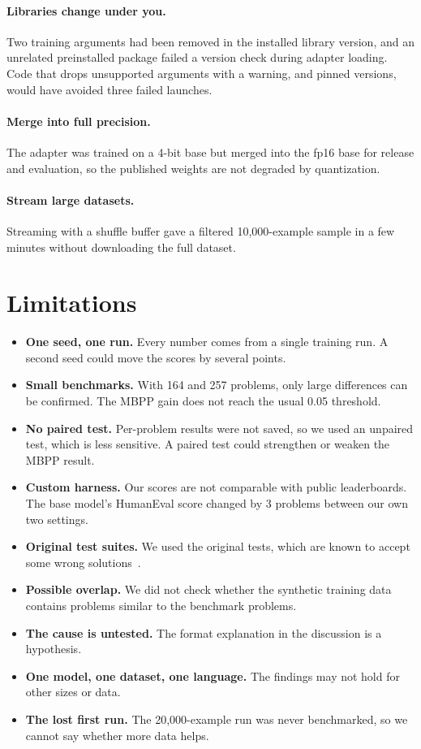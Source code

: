 \documentclass[11pt,a4paper]{article}
\begin{document}
\paragraph{Libraries change under you.} Two training arguments had been removed in the installed library version, and an unrelated preinstalled package failed a version check during adapter loading. Code that drops unsupported arguments with a warning, and pinned versions, would have avoided three failed launches.

\paragraph{Merge into full precision.} The adapter was trained on a 4-bit base but merged into the fp16 base for release and evaluation, so the published weights are not degraded by quantization.

\paragraph{Stream large datasets.} Streaming with a shuffle buffer gave a filtered 10,000-example sample in a few minutes without downloading the full dataset.

\section{Limitations}
\label{sec:limits}
\begin{itemize}
\item \textbf{One seed, one run.} Every number comes from a single training run. A second seed could move the scores by several points.
\item \textbf{Small benchmarks.} With 164 and 257 problems, only large differences can be confirmed. The MBPP gain does not reach the usual 0.05 threshold.
\item \textbf{No paired test.} Per-problem results were not saved, so we used an unpaired test, which is less sensitive. A paired test could strengthen or weaken the MBPP result.
\item \textbf{Custom harness.} Our scores are not comparable with public leaderboards. The base model's HumanEval score changed by 3 problems between our own two settings.
\item \textbf{Original test suites.} We used the original tests, which are known to accept some wrong solutions~\cite{evalplus}.
\item \textbf{Possible overlap.} We did not check whether the synthetic training data contains problems similar to the benchmark problems.
\item \textbf{The cause is untested.} The format explanation in the discussion is a hypothesis.
\item \textbf{One model, one dataset, one language.} The findings may not hold for other sizes or data.
\item \textbf{The lost first run.} The 20,000-example run was never benchmarked, so we cannot say whether more data helps.
\end{itemize}
\end{document}
